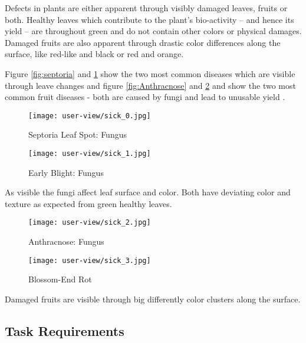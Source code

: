 Defects in plants are either apparent through visibly damaged leaves, fruits or both.
Healthy leaves which contribute to the plant's bio-activity -- and hence its yield -- are throughout green
and do not contain other colors or physical damages.
Damaged fruits are also apparent through drastic color differences along the surface,
like red-like and black or red and orange.

Figure \ref{fig:septoria} and \ref{fig:blight} show the two most common diseases which are visible through leave changes and
figure \ref{fig:Anthracnose} and \ref{fig:blossom} and show the two most common fruit diseases - both are caused by fungi
and lead to unusable yield \cite{diseases}.

\begin{figure}[H]
    \centering
    \begin{minipage}[b]{0.45\textwidth}
        \texttt{[image: user-view/sick\_0.jpg]}
        \caption{Septoria Leaf Spot: Fungus}
        \label{fig:septoria}
    \end{minipage}
    \hfill
    \begin{minipage}[b]{0.45\textwidth}
        \texttt{[image: user-view/sick\_1.jpg]}
        \caption{Early Blight: Fungus}
        \label{fig:blight}
    \end{minipage}
\end{figure}

As visible the fungi affect leaf surface and color. Both have deviating color and texture
as expected from green healthy leaves.

\begin{figure}[H]
    \centering
    \begin{minipage}[b]{0.45\textwidth}
        \texttt{[image: user-view/sick\_2.jpg]}
        \caption{Anthracnose: Fungus}
        \label{fig:Anthracnose}
    \end{minipage}
    \hfill
    \begin{minipage}[b]{0.45\textwidth}
        \texttt{[image: user-view/sick\_3.jpg]}
        \caption{Blossom-End Rot}
        \label{fig:blossom}
    \end{minipage}
\end{figure}

Damaged fruits are visible through big differently color clusters along the surface.

\clearpage
\subsection{Task Requirements}\label{subsec:task-requirements}

